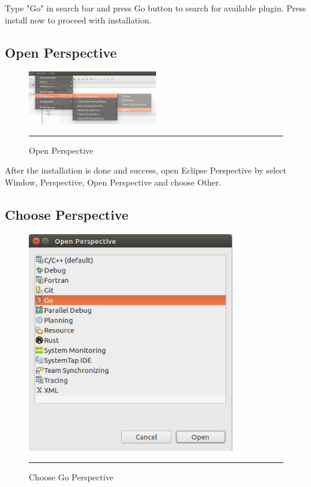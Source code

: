 Type "Go" in search bar and press Go button to search for available plugin. Press install now to proceed with installation. 

\subsection{Open Perspective}

\begin{figure}[H]
	\centering
	\includegraphics[width=0.5\textwidth]{Figure/AppendixA/goclipse-installation/goclipse-open-perspective-3.png}
	\rule{35em}{0.5pt}
	\caption[Open Perspective]{Open Perspective}
\end{figure}

After the installation is done and success, open Eclipse Perspective by select Window, Perspective, Open Perspective and choose Other.

\subsection{Choose Perspective}

\begin{figure}[H]
	\centering
	\includegraphics[width=0.8\textwidth]{Figure/AppendixA/goclipse-installation/goclipse-choose-4.png}
	\rule{35em}{0.5pt}
	\caption[Open Perspective]{Choose Go Perspective}
\end{figure}

